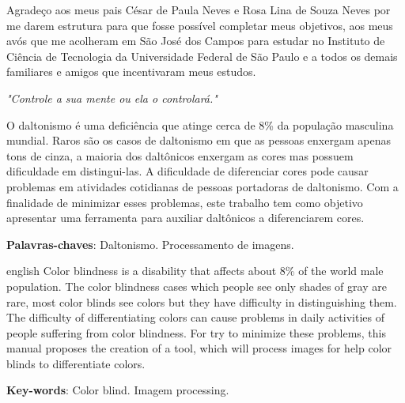\documentclass[	12pt, Times, openright, twoside, a4paper, english, brazil]{abntex2}
\begin{document}
\begin{agradecimentos}
Agradeço aos meus pais César de Paula Neves e Rosa Lina de Souza Neves por me darem estrutura para que fosse possível completar meus objetivos, aos meus avós que me acolheram em São José dos Campos para estudar no Instituto de Ciência de Tecnologia da Universidade Federal de São Paulo e a todos os demais familiares e amigos que incentivaram meus estudos.


\end{agradecimentos}

\begin{epigrafe}
    \vspace*{\fill}
	\begin{flushright}
		\textit{"Controle a sua mente ou ela o controlará."}
	\end{flushright}
\end{epigrafe}


\begin{resumo}
O daltonismo é uma deficiência que atinge cerca de 8\% da população masculina mundial. Raros são os casos de daltonismo em que as pessoas enxergam apenas tons de cinza, a maioria dos daltônicos enxergam as cores mas possuem dificuldade em distingui-las. A dificuldade de diferenciar cores pode causar problemas em atividades cotidianas de pessoas portadoras de daltonismo. Com a finalidade de minimizar esses problemas, este trabalho tem como objetivo apresentar uma ferramenta para auxiliar daltônicos a diferenciarem cores.

 \vspace{\onelineskip}
    
 \noindent
 \textbf{Palavras-chaves}: Daltonismo. Processamento de imagens. 
\end{resumo}

\begin{resumo}[Abstract]
 \begin{otherlanguage*}{english}
Color blindness is a disability that affects about 8\% of the world male population. The color blindness cases which people see only shades of gray are rare, most color blinds see colors but they have difficulty in distinguishing them. The difficulty of differentiating colors can cause problems in daily activities of people suffering from color blindness. For try to minimize these problems, this manual proposes the creation of a tool, which will process images for help color blinds to differentiate colors.

\vspace{\onelineskip}
 
   \noindent 
   \textbf{Key-words}: Color blind. Imagem processing.
 \end{otherlanguage*}
\end{resumo}
\end{document}
